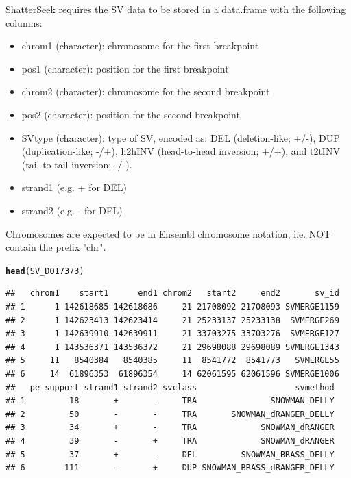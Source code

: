 \documentclass[twoside,a4wide,11pt]{article}\usepackage[]{graphicx}\usepackage[]{color}
\makeatletter
\newcommand{\hlstd}[1]{\textcolor[rgb]{0.345,0.345,0.345}{#1}}%
\newcommand{\hlkwd}[1]{\textcolor[rgb]{0.737,0.353,0.396}{\textbf{#1}}}%
\newenvironment{kframe}{%
 \def\at@end@of@kframe{}%
 \ifinner\ifhmode%
  \def\at@end@of@kframe{\end{minipage}}%
  \begin{minipage}{\columnwidth}%
 \fi\fi%
 \def\FrameCommand##1{\hskip\@totalleftmargin \hskip-\fboxsep
 \colorbox{shadecolor}{##1}\hskip-\fboxsep
     \hskip-\linewidth \hskip-\@totalleftmargin \hskip\columnwidth}%
 \MakeFramed {\advance\hsize-\width
   \@totalleftmargin\z@ \linewidth\hsize
   \@setminipage}}%
 {\par\unskip\endMakeFramed%
 \at@end@of@kframe}
\newenvironment{knitrout}{}{} %
\makeatother
\begin{document}
ShatterSeek requires the SV data to be stored in a data.frame with the following columns: 
\begin{itemize}
\item chrom1 (character): chromosome for the first breakpoint
\item pos1 (character): position for the first breakpoint
\item chrom2 (character): chromosome for the second breakpoint 
\item pos2 (character): position for the second breakpoint
\item SVtype (character): type of SV, encoded as: DEL (deletion-like; +/-), DUP (duplication-like; -/+),
h2hINV (head-to-head inversion; +/+), and t2tINV (tail-to-tail inversion; -/-).
\item strand1 (e.g. + for DEL)
\item strand2 (e.g. - for DEL)
\end{itemize}
Chromosomes are expected to be in Ensembl chromosome notation, i.e. NOT contain the prefix "chr".\\
\begin{knitrout}
\color{fgcolor}\begin{kframe}
\begin{alltt}
\hlkwd{head}\hlstd{(SV_DO17373)}
\end{alltt}
\begin{verbatim}
##   chrom1    start1      end1 chrom2   start2     end2       sv_id
## 1      1 142618685 142618686     21 21708092 21708093 SVMERGE1159
## 2      1 142623413 142623414     21 25233137 25233138  SVMERGE269
## 3      1 142639910 142639911     21 33703275 33703276  SVMERGE127
## 4      1 143536371 143536372     21 29698088 29698089 SVMERGE1343
## 5     11   8540384   8540385     11  8541772  8541773   SVMERGE55
## 6     14  61896353  61896354     14 62061595 62061596 SVMERGE1006
##   pe_support strand1 strand2 svclass                    svmethod
## 1         18       +       -     TRA               SNOWMAN_DELLY
## 2         50       -       -     TRA       SNOWMAN_dRANGER_DELLY
## 3         34       +       -     TRA             SNOWMAN_dRANGER
## 4         39       -       +     TRA             SNOWMAN_dRANGER
## 5         37       +       -     DEL         SNOWMAN_BRASS_DELLY
## 6        111       -       +     DUP SNOWMAN_BRASS_dRANGER_DELLY
\end{verbatim}
\end{kframe}
\end{knitrout}
\end{document}

